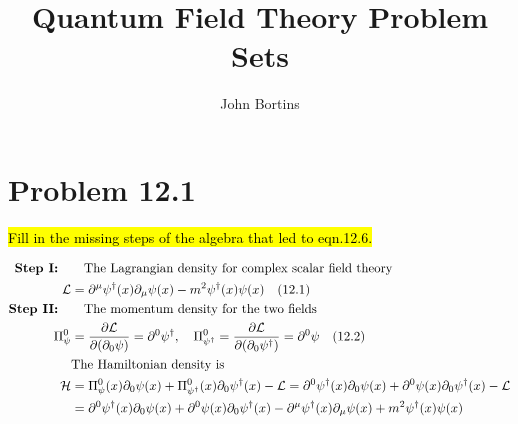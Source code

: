\documentclass{article}
\title{Quantum Field Theory Problem Sets}
\author{John Bortins}
\begin{document}
\maketitle{}


\section*{Problem 12.1}
\begin{quoting}
    \hl{Fill in the missing steps of the algebra that led to eqn.12.6.}
\end{quoting}
\begin{align*}
    \qq*{\textbf{Step I:}}   & \qq{The Lagrangian density for complex scalar field theory}                                                                                                                                    \\
    \mathcal{L}              & =\partial^\mu\psi^\dagger(x)\partial_\mu\psi(x)-m^2\psi^\dagger(x)\psi(x)\qq{(12.1)}                                                                                                           \\
    \qq*{\textbf{Step II:}}  & \qq{The momentum density for the two fields}                                                                                                                                                   \\
    \Pi^0_\psi               & =\pdv{\mathcal{L}}{(\partial_0\psi)}=
    \partial^0\psi^\dagger\qcomma\Pi^0_{\psi^\dagger}=\pdv{\mathcal{L}}{(\partial_0\psi^\dagger)}=
    \partial^0\psi\qq{(12.2)}                                                                                                                                                                                                 \\
                             & \qq*{The Hamiltonian density is}                                                                                                                                                               \\
    \mathcal{H}              & =\Pi^0_\psi(x)\partial_0\psi(x)+\Pi^0_{\psi^\dagger}(x)\partial_0\psi^\dagger(x)-\mathcal{L}=\partial^0\psi^\dagger(x)\partial_0\psi(x)+\partial^0\psi(x)\partial_0\psi^\dagger(x)-\mathcal{L} \\
                             & =\partial^0\psi^\dagger(x)\partial_0\psi(x)+\partial^0\psi(x)\partial_0\psi^\dagger(x)-\partial^\mu\psi^\dagger(x)\partial_\mu\psi(x)+m^2\psi^\dagger(x)\psi(x)                                \\

\end{align*}
\end{document}
